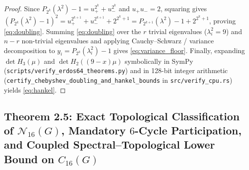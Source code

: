 \documentclass[10pt,a4paper]{article}
\theoremstyle{definition}
\theoremstyle{remark}
\begin{document}
\begin{proof}
Since $P_{2^k}(\lambda^2) - 1 = u_+^{2^k} + u_-^{2^k}$ and $u_+ u_- = 2$, squaring gives $(P_{2^k}(\lambda^2) - 1)^2 = u_+^{2^{k+1}} + u_-^{2^{k+1}} + 2^{2^k+1} = P_{2^{k+1}}(\lambda^2) - 1 + 2^{2^k+1}$, proving \eqref{eq:doubling}. Summing \eqref{eq:doubling} over the $r$ trivial eigenvalues ($\lambda_i^2 = 9$) and $n - r$ non-trivial eigenvalues and applying Cauchy--Schwarz / variance decomposition to $y_i = P_{2^k}(\lambda_i^2) - 1$ gives \eqref{eq:variance_floor}. Finally, expanding $\det H_3(\mu)$ and $\det H_2((9-x)\mu)$ symbolically in SymPy (\texttt{scripts/verify\_erdos64\_theorems.py}) and in 128-bit integer arithmetic (\texttt{certify\_chebyshev\_doubling\_and\_hankel\_bounds} in \texttt{src/verify\_cpu.rs}) yields \eqref{eq:hankel}.
\end{proof}

\subsection{Theorem 2.5: Exact Topological Classification of $\mathcal{N}_{16}(G)$, Mandatory $6$-Cycle Participation, and Coupled Spectral--Topological Lower Bound on $C_{16}(G)$}
\end{document}
